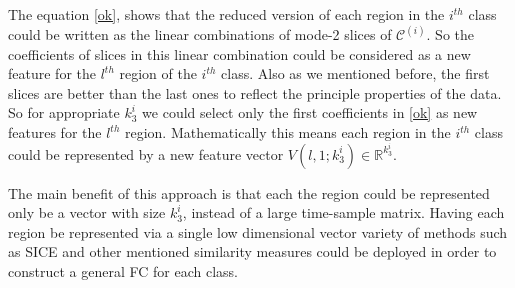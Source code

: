 \documentclass[journal]{IEEEtran}
\newcommand{\trans}{\mathsf{T}}
\begin{document}
	The equation \eqref{ok}, shows that the reduced version of each region in the $i^{th}$ class could be
	written as the linear combinations of  mode-2 slices of $\mathcal{C}^{(i)}$. So the coefficients of slices in this linear combination could be considered as a new feature for the $l^{th}$ region of the $i^{th}$ class. Also as we mentioned before, the first slices are better than the last ones to reflect the principle properties of the data. So for appropriate $k_3^i$ we could select only the first coefficients in \eqref{ok} as new features for the $l^{th}$ region. Mathematically this means each region  in the $i^{th}$ class could be represented by a new feature vector $V(l,1;k_3^i)\in \mathbb{R}^{k_3^i}$.   
	
	The main benefit of this approach is that each
	the region could be represented only be a vector with size $k_3^i$, instead of a large time-sample matrix. Having each region be represented via a single low dimensional vector variety of methods such as SICE and other mentioned similarity measures could be deployed in order to construct a general FC for each class. 
	
\end{document}

